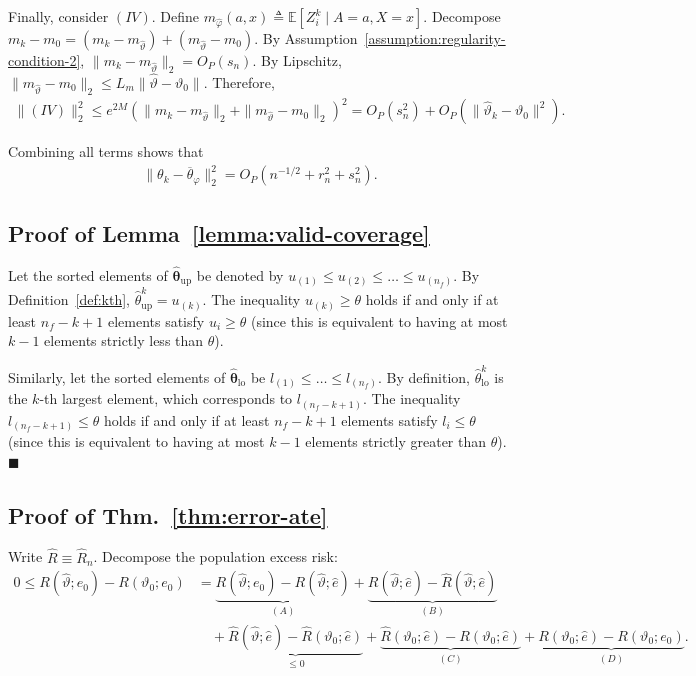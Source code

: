 Finally, consider $(IV)$. Define $m_{\widehat{\varphi}}(a,x) \triangleq \mathbb{E}[Z^k_i \mid A=a,X=x]$. 
Decompose $m_k - m_0 = (m_k - m_{\widehat{\vartheta}}) + (m_{\widehat{\vartheta}} - m_0)$.
By Assumption~\ref{assumption:regularity-condition-2}, $\|m_k - m_{\widehat{\vartheta}}\|_2  = O_P(s_n)$. By Lipschitz, $\|m_{\widehat{\vartheta}} - m_0\|_2 \leq L_m \|\widehat{\vartheta} - \vartheta_0 \|$.
Therefore, 
\begin{align}
    \|(IV) \|^2_2 \leq e^{2M}(\|m_k - m_{\widehat{\vartheta}}\|_2 + \|m_{\widehat{\vartheta}} - m_0\|_2)^2 = O_P(s^2_n) + O_P(\| \widehat{\vartheta}_k - \vartheta_0 \|^2).
\end{align}

Combining all terms shows that 
\begin{align}
    \| \theta_k - \overline{\theta}_{\varphi} \|^2_2 = O_P(n^{-1/2} + r^2_n + s^2_n).
\end{align}



\subsection*{Proof of Lemma~\ref{lemma:valid-coverage}}

Let the sorted elements of $\widehat{\boldsymbol{\theta}}_{\mathrm{up}}$ be denoted by $u_{(1)} \le u_{(2)} \le \dots \le u_{(n_f)}$. By Definition~\ref{def:kth}, $\widehat{\theta}^{k}_{\mathrm{up}} = u_{(k)}$. The inequality $u_{(k)} \ge \theta$ holds if and only if at least $n_f - k + 1$ elements satisfy $u_i \ge \theta$ (since this is equivalent to having at most $k-1$ elements strictly less than $\theta$).

Similarly, let the sorted elements of $\widehat{\boldsymbol{\theta}}_{\mathrm{lo}}$ be $l_{(1)} \le \dots \le l_{(n_f)}$. By definition, $\widehat{\theta}^{k}_{\mathrm{lo}}$ is the $k$-th largest element, which corresponds to $l_{(n_f - k + 1)}$. The inequality $l_{(n_f - k + 1)} \le \theta$ holds if and only if at least $n_f - k + 1$ elements satisfy $l_i \le \theta$ (since this is equivalent to having at most $k-1$ elements strictly greater than $\theta$). \hfill $\blacksquare$


\subsection*{Proof of Thm.~\ref{thm:error-ate}}
Write $\widehat R\equiv \widehat R_n$. Decompose the population excess risk:
\begin{align*}
0 \le R(\widehat\vartheta; e_0) - R(\vartheta_0; e_0)
&= \underbrace{R(\widehat\vartheta;e_0)-R(\widehat\vartheta;\widehat e)}_{(A)}
 +\underbrace{R(\widehat\vartheta;\widehat e)-\widehat R(\widehat\vartheta;\widehat e)}_{(B)} \\
&\quad+\underbrace{\widehat R(\widehat\vartheta;\widehat e)-\widehat R(\vartheta_0;\widehat e)}_{\le 0}
 +\underbrace{\widehat R(\vartheta_0;\widehat e)-R(\vartheta_0;\widehat e)}_{(C)}
 +\underbrace{R(\vartheta_0;\widehat e)-R(\vartheta_0;e_0)}_{(D)} .
\end{align*}

